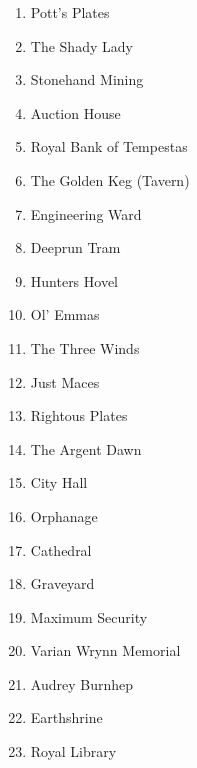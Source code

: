 \begin{center}
{\begin{multicols}{3}
\begin{enumerate}
			\item Pott's Plates
			\item The Shady Lady
			\item Stonehand Mining
			\item Auction House
			\item Royal Bank of Tempestas
			\item The Golden Keg (Tavern)
			\item Engineering Ward
			\item Deeprun Tram
			\item Hunters Hovel
			\item Ol' Emmas
			\item The Three Winds
			\item Just Maces
			\item Rightous Plates
			\item The Argent Dawn
			\item City Hall
			\item Orphanage
			\item Cathedral
			\item Graveyard
			\item Maximum Security
			\item Varian Wrynn Memorial
			\item Audrey Burnhep
			\item Earthshrine
			\item Royal Library
		\end{enumerate}
	\end{multicols}}
\end{center}









